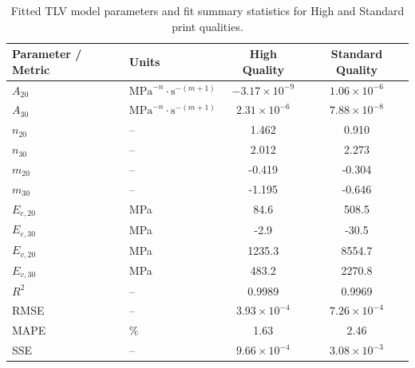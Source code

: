 \begin{table}[H]
    \centering
    \caption{Fitted TLV model parameters and fit summary statistics for High and Standard print qualities.}
    \label{tab:tlv_summary}
    \begin{tabular}{llcc}
        \toprule
        \textbf{Parameter / Metric} & \textbf{Units} & \textbf{High Quality} & \textbf{Standard Quality} \\
        \midrule
        $A_{20}$ & $\text{MPa}^{-n}\cdot\text{s}^{-(m+1)}$ & $-3.17 \times 10^{-9}$ & $1.06 \times 10^{-6}$ \\
        $A_{30}$ & $\text{MPa}^{-n}\cdot\text{s}^{-(m+1)}$ & $2.31 \times 10^{-6}$ & $7.88 \times 10^{-8}$ \\
        $n_{20}$ & -- & 1.462 & 0.910 \\
        $n_{30}$ & -- & 2.012 & 2.273 \\
        $m_{20}$ & -- & -0.419 & -0.304 \\
        $m_{30}$ & -- & -1.195 & -0.646 \\
        $E_{e,20}$ & MPa & 84.6 & 508.5 \\
        $E_{e,30}$ & MPa & -2.9 & -30.5 \\
        $E_{v,20}$ & MPa & 1235.3 & 8554.7 \\
        $E_{v,30}$ & MPa & 483.2 & 2270.8 \\
        \midrule
        $R^2$ & -- & 0.9989 & 0.9969 \\
        RMSE & -- & $3.93 \times 10^{-4}$ & $7.26 \times 10^{-4}$ \\
        MAPE & \% & 1.63 & 2.46 \\
        SSE & -- & $9.66 \times 10^{-4}$ & $3.08 \times 10^{-3}$ \\
        \bottomrule
    \end{tabular}
\end{table}
